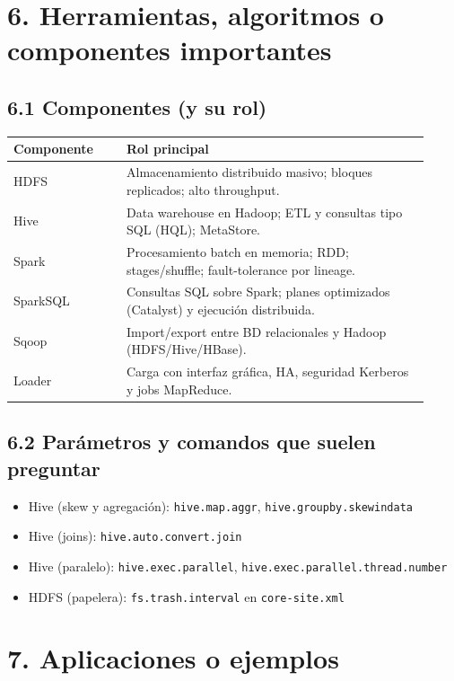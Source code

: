 \documentclass[8pt,a4paper,twocolumn]{article}
\begin{document}
\section{6. Herramientas, algoritmos o componentes importantes}
\subsection{6.1 Componentes (y su rol)}
\begin{center}
\begin{tabular}{@{}p{0.25\linewidth}p{0.67\linewidth}@{}}
\toprule
\textbf{Componente} & \textbf{Rol principal} \\
\midrule
HDFS & Almacenamiento distribuido masivo; bloques replicados; alto throughput. \\
Hive & Data warehouse en Hadoop; ETL y consultas tipo SQL (HQL); MetaStore. \\
Spark & Procesamiento batch en memoria; RDD; stages/shuffle; fault-tolerance por lineage. \\
SparkSQL & Consultas SQL sobre Spark; planes optimizados (Catalyst) y ejecución distribuida. \\
Sqoop & Import/export entre BD relacionales y Hadoop (HDFS/Hive/HBase). \\
Loader & Carga con interfaz gráfica, HA, seguridad Kerberos y jobs MapReduce. \\
\bottomrule
\end{tabular}
\end{center}

\subsection{6.2 Parámetros y comandos que suelen preguntar}
\begin{itemize}
\item Hive (skew y agregación): \texttt{hive.map.aggr}, \texttt{hive.groupby.skewindata}
\item Hive (joins): \texttt{hive.auto.convert.join}
\item Hive (paralelo): \texttt{hive.exec.parallel}, \texttt{hive.exec.parallel.thread.number}
\item HDFS (papelera): \texttt{fs.trash.interval} en \texttt{core-site.xml}
\end{itemize}

\section{7. Aplicaciones o ejemplos}
\end{document}
